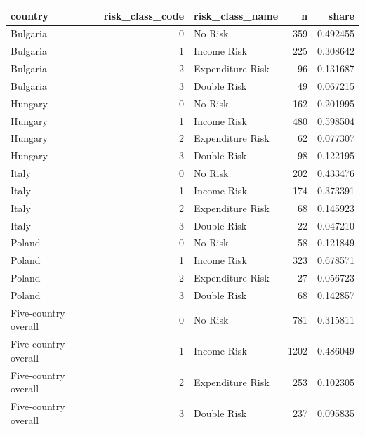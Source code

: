 \begin{tabular}{lrlrr}
\toprule
country & risk_class_code & risk_class_name & n & share \\
\midrule
Bulgaria & 0 & No Risk & 359 & 0.492455 \\
Bulgaria & 1 & Income Risk & 225 & 0.308642 \\
Bulgaria & 2 & Expenditure Risk & 96 & 0.131687 \\
Bulgaria & 3 & Double Risk & 49 & 0.067215 \\
Hungary & 0 & No Risk & 162 & 0.201995 \\
Hungary & 1 & Income Risk & 480 & 0.598504 \\
Hungary & 2 & Expenditure Risk & 62 & 0.077307 \\
Hungary & 3 & Double Risk & 98 & 0.122195 \\
Italy & 0 & No Risk & 202 & 0.433476 \\
Italy & 1 & Income Risk & 174 & 0.373391 \\
Italy & 2 & Expenditure Risk & 68 & 0.145923 \\
Italy & 3 & Double Risk & 22 & 0.047210 \\
Poland & 0 & No Risk & 58 & 0.121849 \\
Poland & 1 & Income Risk & 323 & 0.678571 \\
Poland & 2 & Expenditure Risk & 27 & 0.056723 \\
Poland & 3 & Double Risk & 68 & 0.142857 \\
Five-country overall & 0 & No Risk & 781 & 0.315811 \\
Five-country overall & 1 & Income Risk & 1202 & 0.486049 \\
Five-country overall & 2 & Expenditure Risk & 253 & 0.102305 \\
Five-country overall & 3 & Double Risk & 237 & 0.095835 \\
\bottomrule
\end{tabular}
